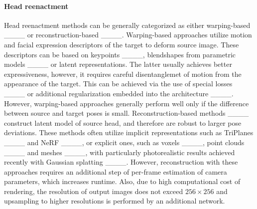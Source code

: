 \vspace{-8pt}
\paragraph{Head reenactment} 
Head reenactment methods can be generally categorized as either warping-based ____ or reconstruction-based ____. Warping-based approaches utilize motion and facial expression descriptors of the target to deform source image. These descriptors can be based on keypoints ____, blendshapes from parametric models ____ or latent representations. The latter usually achieves better expressiveness, however, it requires careful disentanglemet of motion from the appearance of the target. This can be achieved via the use of special losses ____ or additional regularization embedded into the architecture ____. However, warping-based approaches generally perform well only if the difference between source and target poses is small.
Reconstruction-based methods ____ construct latent model of source head, and therefore are robust to larger pose deviations. These methods often utilize implicit representations such as TriPlanes ____ and NeRF ____, or explicit  ones, such as voxels ____, point clouds ____ and meshes ____, with particularly photorealistic results achieved recently with Gaussian splatting ____. However, reconstruction with these approaches requires an additional step of per-frame estimation of camera parameters, which increases runtime. Also, due to high computational cost of rendering, the resolution of output images does not exceed $256 \times 256$ and upsampling to higher resolutions is performed by an additional network.